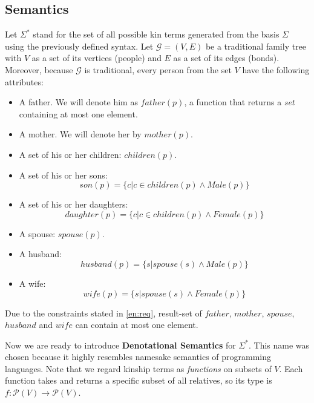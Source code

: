     \subsection{Semantics}
    Let $\Sigma^*$ stand for the set of all possible kin terms generated from the basis $\Sigma$ using the previously defined syntax.
    Let $\mathcal{G} = (V, E)$ be a traditional family tree with $V$ as a set of its vertices (people) and $E$ as a set of its
    edges (bonds). Moreover, because $\mathcal{G}$ is traditional, every person from the set $V$ have the following attributes:
    \begin{itemize}
        \item{A father. We will denote him as $father(p)$, a function that returns a \textit{set} containing at most one element.}
        \item{A mother. We will denote her by $mother(p)$.}
        \item{A set of his or her children: $children(p)$.}
        \item{A set of his or her sons: \[son(p) = \{c | c \in children(p) \land Male(p)\}\]}
        \item{A set of his or her daughters: \[daughter(p) = \{c | c \in children(p) \land Female(p)\}\]}
        \item{A spouse: $spouse(p)$.}
        \item{A husband: \[husband(p) = \{s | spouse(s) \land Male(p)\}\]}
        \item{A wife: \[wife(p) = \{s | spouse(s) \land Female(p)\}\]}
    \label{it:basic-func}
    \end{itemize}
    Due to the constraints stated in \ref{en:req}, result-set of $father$, $mother$, $spouse$, $husband$ and $wife$ can contain at
    most one element.

    Now we are ready to introduce \textbf{Denotational Semantics} for $\Sigma^*$. This name was chosen because it highly resembles
    namesake semantics of programming languages. Note that we regard kinship terms as \textit{functions} on subsets of $V$. Each
    function takes and returns a specific subset of all relatives, so its type is $f : \mathcal{P}(V) \to \mathcal{P}(V)$.

